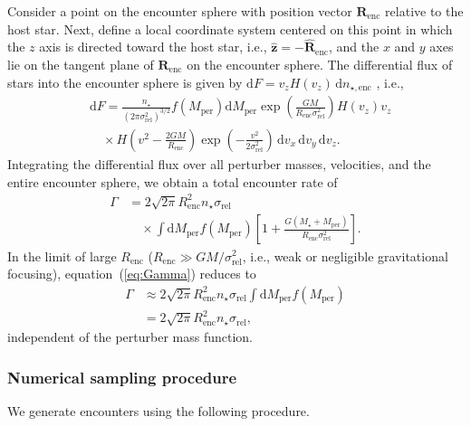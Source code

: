\documentclass[iop,usenatbib]{emulateapj}
\newcommand{\ve}[1]{\boldsymbol{#1}}
\newcommand{\unit}[1]{\hat{\boldsymbol{#1}}}
\newcommand{\renc}{R_\mathrm{enc}}
\newcommand{\mper}{M_\mathrm{per}}
\newcommand{\srel}{\sigma_\mathrm{rel}}
\begin{document}
Consider a point on the encounter sphere with position vector $\ve{R}_\mathrm{enc}$ relative to the host star. Next, define a local coordinate system centered on this point in which the $z$ axis is directed toward the host star, i.e., $\hat{\boldsymbol{z}} = - \unit{R}_\mathrm{enc}$, and the $x$ and $y$ axes lie on the tangent plane of $\ve{R}_\mathrm{enc}$ on the encounter sphere. The differential flux of stars into the encounter sphere is given by $\mathrm{d} F = v_z H(v_z) \,\mathrm{d} n_{\star,\mathrm{enc}}$ \citep{1972A&A....19..488H}, i.e.,
\begin{align}
\label{eq:vel_distr}
\nonumber &\mathrm{d} F = \frac{ n_\star}{(2\pi \srel^2 )^{3/2}} f(\mper) \mathrm{d} \mper \exp \left ( \frac{GM}{\renc \srel^2} \right ) H(v_z) v_z \\
&\quad \times H\left(v^2-\frac{2GM}{\renc} \right ) \exp \left ( -\frac{v^2}{2 \srel^2} \right ) \, \mathrm{d} v_x \, \mathrm{d} v_y \, \mathrm{d} v_z.
\end{align}
Integrating the differential flux over all perturber masses, velocities, and the entire encounter sphere, we obtain a total encounter rate of
\begin{align}
\label{eq:Gamma}
\nonumber \Gamma &= 2 \sqrt{2\pi} \renc^2 n_{\star} \srel \\
&\quad \times \int \mathrm{d} \mper f(\mper ) \left [1 + \frac{G(M_\star+\mper)}{\renc \srel^2} \right ].
\end{align}
In the limit of large $\renc$ ($\renc \gg GM/\srel^2$, i.e., weak or negligible gravitational focusing), equation~(\ref{eq:Gamma}) reduces to
\begin{align}
\label{eq:Gamma_limit}
\nonumber \Gamma &\approx 2 \sqrt{2\pi} \renc^2 n_{\star} \srel \int \mathrm{d} \mper f(\mper ) \\
&= 2 \sqrt{2\pi} \renc^2 n_{\star} \srel,
\end{align}
independent of the perturber mass function. 

\subsubsection{Numerical sampling procedure}
\label{sect:pop_syn:enc_gen:sampling}

We generate encounters using the following procedure. 
\end{document}

